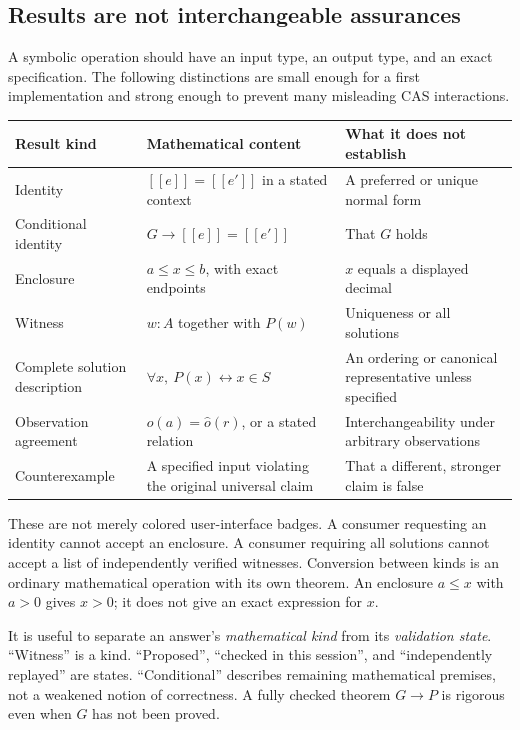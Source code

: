 \documentclass[11pt,a4paper]{article}
\newcommand{\den}[1]{[\![#1]\!]}
\theoremstyle{definition}
\begin{document}
\subsection{Results are not interchangeable assurances}
A symbolic operation should have an input type, an output type, and an exact
specification. The following distinctions are small enough for a first
implementation and strong enough to prevent many misleading CAS interactions.
\begin{center}
\begin{tabularx}{\textwidth}{@{}P{.22\textwidth}YP{.28\textwidth}@{}}
\toprule
Result kind & Mathematical content & What it does not establish \\
\midrule
Identity & $\den e=\den {e'}$ in a stated context & A preferred or unique normal form \\
Conditional identity & $G\to\den e=\den {e'}$ & That $G$ holds \\
Enclosure & $a\leq x\leq b$, with exact endpoints & $x$ equals a displayed decimal \\
Witness & $w:A$ together with $P(w)$ & Uniqueness or all solutions \\
Complete solution description & $\forall x,\ P(x)\leftrightarrow x\in S$ & An ordering or canonical representative unless specified \\
Observation agreement & $o(a)=\widehat o(r)$, or a stated relation & Interchangeability under arbitrary observations \\
Counterexample & A specified input violating the original universal claim & That a different, stronger claim is false \\
\bottomrule
\end{tabularx}
\end{center}

These are not merely colored user-interface badges. A consumer requesting an
identity cannot accept an enclosure. A consumer requiring all solutions cannot
accept a list of independently verified witnesses. Conversion between kinds is
an ordinary mathematical operation with its own theorem. An enclosure $a\le x$
with $a>0$ gives $x>0$; it does not give an exact expression for $x$.

It is useful to separate an answer's \emph{mathematical kind} from its
\emph{validation state}. ``Witness'' is a kind. ``Proposed'', ``checked in this
session'', and ``independently replayed'' are states. ``Conditional'' describes
remaining mathematical premises, not a weakened notion of correctness. A fully
checked theorem $G\to P$ is rigorous even when $G$ has not been proved.
\end{document}
